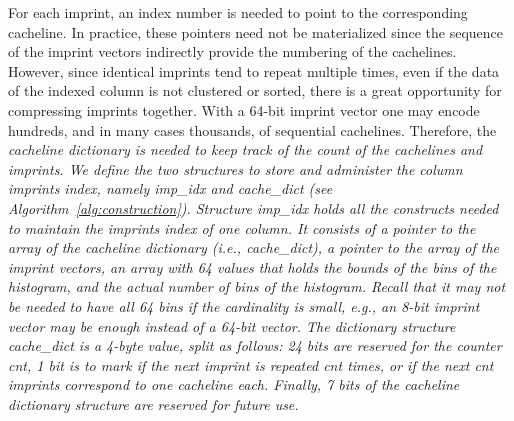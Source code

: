 For each imprint, an index number is needed to point to the corresponding
cacheline. In practice, these pointers need not be materialized since the
sequence of the imprint vectors indirectly provide the numbering of the
cachelines. However, since identical imprints tend to repeat multiple times,
even if the data of the indexed column is not clustered or sorted, there is
a great opportunity for compressing imprints together. With a 64-bit imprint
vector one may encode hundreds, and in many cases thousands, of sequential
cachelines. Therefore, the \it{cacheline dictionary} is needed to keep track
of the count of the cachelines and imprints. We define the two structures to
store and administer the column imprints index, namely \it{imp\_idx} and
\it{cache\_dict} (see Algorithm~\ref{alg:construction}). Structure
\it{imp\_idx} holds all the constructs needed to
maintain the imprints index of one column. It consists of a pointer to the
array of the cacheline dictionary (i.e., \it{cache\_dict}), a pointer to the
array of the imprint vectors, an array with 64 values that holds the bounds of
the bins of the histogram, and the actual number of bins of the histogram.
Recall that it may not be needed to have all 64 bins if the cardinality is
small, e.g., an 8-bit imprint vector may be enough instead of a 64-bit vector.
The dictionary structure \it{cache\_dict} is a 4-byte value, split as follows:
24 bits are reserved for the counter \it{cnt}, 1 bit is to mark if the next
imprint is repeated \it{cnt} times, or if the next \it{cnt} imprints correspond
to one cacheline each. Finally, 7 bits of the cacheline dictionary structure
are reserved for future use.

